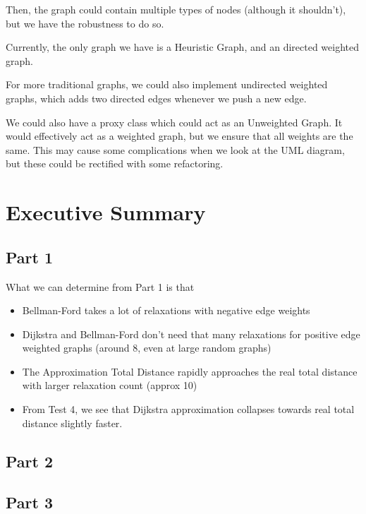 \documentclass{article}
\begin{document}
Then, the graph could contain multiple types of nodes (although it shouldn't), but we have the robustness to do so.

Currently, the only graph we have is a Heuristic Graph, and an directed weighted graph.

For more traditional graphs, we could also implement undirected weighted graphs, which adds two directed edges whenever we push a new edge.

We could also have a proxy class which could act as an Unweighted Graph. It would effectively act as a weighted graph, but we ensure that all weights are the same. This may cause some complications when we look at the UML diagram, but these could be rectified with some refactoring.

\newpage
\section{Executive Summary}

\subsection{Part 1}

What we can determine from Part 1 is that
\begin{itemize}
    \item Bellman-Ford takes a lot of relaxations with negative edge weights
    \item Dijkstra and Bellman-Ford don't need that many relaxations for positive edge weighted graphs (around 8, even at large random graphs)
    \item The Approximation Total Distance rapidly approaches the real total distance with larger relaxation count (approx 10)
    \item From Test 4, we see that Dijkstra approximation collapses towards real total distance slightly faster.
\end{itemize}

\subsection{Part 2}

\subsection{Part 3}
\end{document}
